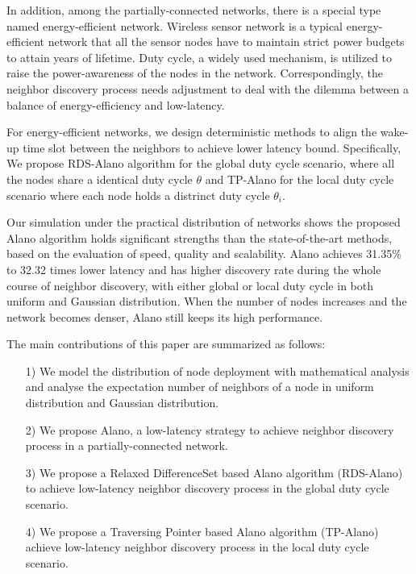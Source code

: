 In addition, among the partially-connected networks, there is a special 
type named energy-efficient network.
Wireless sensor network is a typical energy-efficient network that all the sensor nodes have to maintain 
strict power budgets to attain years of lifetime\cite{dunkels2011contikimac}.
Duty cycle, a widely used mechanism, is utilized to raise the power-awareness of the nodes in the network.
Correspondingly, the neighbor discovery process needs adjustment to deal with the dilemma between 
a balance of energy-efficiency and low-latency.


For energy-efficient networks, we design deterministic methods
to align the wake-up time slot between the neighbors to achieve lower latency bound.
Specifically, We propose RDS-Alano algorithm for the global duty cycle scenario, where 
all the nodes share a identical duty cycle $\theta$ and TP-Alano for the
local duty cycle scenario where each node holds a distrinct duty cycle $\theta_i$. 


Our simulation under the practical distribution of networks 
\cite{wang2013gaussian} shows the proposed Alano algorithm
holds significant strengths than the state-of-the-art methods,
based on the evaluation of speed, quality and scalability.
Alano achieves 31.35\% to 32.32 times lower latency
and has higher discovery rate during the whole course of neighbor discovery, 
with either global or local duty cycle in both uniform and Gaussian distribution.
When the number of nodes increases and the network becomes denser, 
Alano still keeps its high performance. 


The main contributions of this paper are summarized as follows:
\begin{itemize}
\item[1)] We model the distribution of node deployment with mathematical analysis 
and analyse the expectation number of neighbors of a node in uniform distribution and Gaussian
distribution.
\item[2)] We propose Alano, a low-latency strategy to achieve neighbor discovery process
in a partially-connected network.
\item[3)] We propose a Relaxed DifferenceSet based Alano algorithm (RDS-Alano) 
to achieve low-latency neighbor discovery process in the global duty cycle scenario. 
\item[4)] We propose a Traversing Pointer based Alano algorithm (TP-Alano) 
achieve low-latency neighbor discovery process in the local duty cycle scenario. 
\end{itemize}


